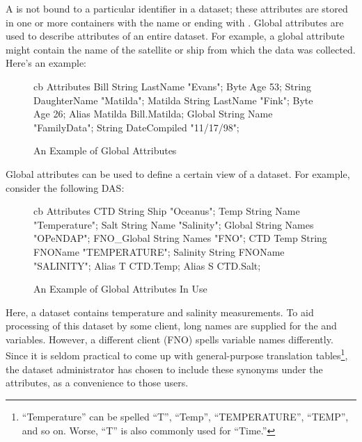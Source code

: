 A  is not bound to a
particular identifier in a dataset; these attributes are stored in one
or more containers with the name  or ending with
.  Global attributes are used to describe attributes of
an entire dataset.  For example, a global attribute might contain the
name of the satellite or ship from which the data was collected.
Here's an example:

\begin{figure}[h]
\begin{vcode}{cb}
Attributes {
   Bill {
      String LastName "Evans";
      Byte Age 53;
      String DaughterName "Matilda";
      Matilda {
         String LastName "Fink";
         Byte Age 26;
      }
   }
   Alias Matilda Bill.Matilda;
   Global {
      String Name "FamilyData";
      String DateCompiled "11/17/98";
   }
}
\end{vcode}    
  \caption{An Example of Global Attributes}
  \label{fig,das,global}
\end{figure}

Global attributes can be used to define a certain view of a dataset.
For example, consider the following DAS: 

\begin{figure}[h]
\begin{vcode}{cb}
Attributes {
   CTD {
      String Ship "Oceanus";
      Temp {
         String Name "Temperature";
      }
      Salt {
         String Name "Salinity";
      }
   }
   Global {
      String Names "OPeNDAP";
   }
   FNO_Global {
      String Names "FNO";
      CTD {
         Temp {
            String FNOName "TEMPERATURE";
         }
         Salinity {
            String FNOName "SALINITY";
         }
      }
      Alias T CTD.Temp;
      Alias S CTD.Salt;
   }
}
\end{vcode}    
  \caption{An Example of Global Attributes In Use}
  \label{fig,das,global-use}
\end{figure}

Here, a dataset contains temperature and salinity measurements.  To
aid processing of this dataset by some \opendap client, long names are
supplied for the  and  variables.  However, a
different client (FNO) spells variable names differently.  Since it is
seldom practical to come up with general-purpose translation
tables\footnote{``Temperature'' can be spelled ``T'', ``Temp'',
  ``TEMPERATURE'', ``TEMP'', and so on.  Worse, ``T'' is also commonly
  used for ``Time.''}, the dataset administrator has chosen to include
these synonyms under the  attributes, as a convenience
to those users.

